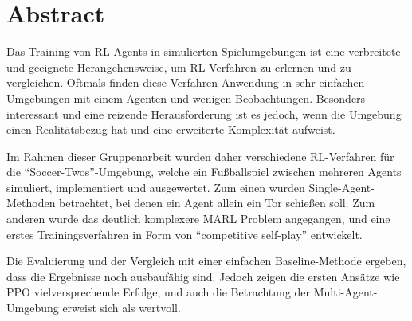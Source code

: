 \chapter*{Abstract}

Das Training von \ac{RL} Agents in simulierten Spielumgebungen ist eine verbreitete und geeignete Herangehensweise, um \ac{RL}-Verfahren zu erlernen und zu vergleichen. Oftmals finden diese Verfahren Anwendung in sehr einfachen Umgebungen mit einem Agenten und wenigen Beobachtungen. Besonders interessant und eine reizende Herausforderung ist es jedoch, wenn die Umgebung einen Realitätsbezug hat und eine erweiterte Komplexität aufweist.

Im Rahmen dieser Gruppenarbeit wurden daher verschiedene \ac{RL}-Verfahren für die ``Soccer-Twos''-Umgebung, welche ein Fußballspiel zwischen mehreren Agents simuliert, implementiert und ausgewertet. Zum einen wurden Single-Agent-Methoden betrachtet, bei denen ein Agent allein ein Tor schießen soll. Zum anderen wurde das deutlich komplexere \ac{MARL} Problem angegangen, und eine erstes Trainingsverfahren in Form von ``competitive self-play'' entwickelt.

Die Evaluierung und der Vergleich mit einer einfachen Baseline-Methode ergeben, dass die Ergebnisse noch ausbaufähig sind. Jedoch zeigen die ersten Ansätze wie \ac{PPO} vielversprechende Erfolge, und auch die Betrachtung der Multi-Agent-Umgebung erweist sich als wertvoll.